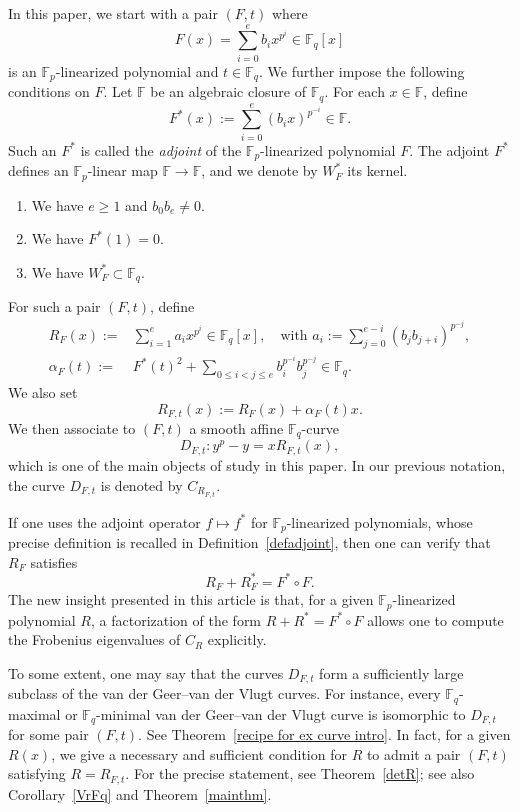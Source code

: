\documentclass[12pt,a4paper]{amsart}
\theoremstyle{definition}
\def\F{{\mathbb F}}
\theoremstyle{remark}
\begin{document}
In this paper, we start with a pair $(F,t)$ where 
\[F(x)=\sum_{i=0}^e b_i x^{p^i} \in \F_q[x]
\] 
is an $\F_p$-linearized polynomial and $t\in \F_q$. We further impose the following conditions on $F$. Let $\F$ be an algebraic closure of $\F_q$. For each $x\in \F$, define 
\[
F^\ast(x):=\sum_{i=0}^e (b_i x)^{p^{-i}}\in\F. \]
Such an $F^\ast$ is called the \emph{adjoint} of the $\F_p$-linearized polynomial $F$. 
The adjoint $F^\ast$ defines an $\F_p$-linear map $\F\to \F$, and we denote by $W_F^\ast$ its kernel. 
\begin{enumerate}
    \item We have $e\geq1$ and $b_0b_e\neq0$. 
    \item  We have $F^\ast(1)=0$. 
\item We have $W_F^\ast\subset \F_q$.   
\end{enumerate}
For such a pair $(F,t)$, define 
\begin{align*}
    R_{F}(x):=&\sum_{i=1}^e a_i x^{p^i} \in \F_q[x], \quad 
\textrm{with } a_i:=\sum_{j=0}^{e-i} (b_j b_{j+i})^{p^{-j}},\\
\alpha_F(t):=&F^\ast(t)^2+\sum_{0 \le i<j \le e} b_i^{p^{-i}} b_j^{p^{-j}} \in \F_q.
\end{align*}
We also set 
\[R_{F,t}(x):=R_F(x)+\alpha_F(t)x.\]
We then associate to $(F,t)$ a smooth affine $\F_q$-curve 
\[
D_{F,t} \colon y^p-y=x R_{F,t}(x), 
\]
which is one of the main objects of study in this paper. 
In our previous notation, the curve $D_{F,t}$ is denoted by $C_{R_{F,t}}$. 

If one uses the adjoint operator $f\mapsto f^\ast$ for $\F_p$-linearized polynomials, whose precise definition is recalled in Definition~\ref{defadjoint}, then one can verify that $R_F$ satisfies 
\[
R_F+R_F^\ast=F^\ast\circ F. 
\]
The new insight presented in this article is that, for a given $\F_p$-linearized polynomial $R$, a factorization of the form $R+R^\ast=F^\ast\circ F$ allows one to compute the Frobenius eigenvalues of $C_R$ explicitly.



To some extent, one may say that the curves $D_{F,t}$ form a sufficiently large subclass of the van der Geer--van der Vlugt curves. For instance, every $\F_q$-maximal or $\F_q$-minimal van der Geer--van der Vlugt curve is isomorphic to $D_{F,t}$ for some pair $(F,t)$. See Theorem~\ref{recipe for ex curve intro}. In fact, for a given $R(x)$, we give a necessary and sufficient condition for $R$ to admit a pair $(F,t)$ satisfying  $R=R_{F,t}$. For the precise statement, see Theorem~\ref{detR}; see also Corollary~\ref{VrFq} and Theorem~\ref{mainthm}. 
\end{document}
